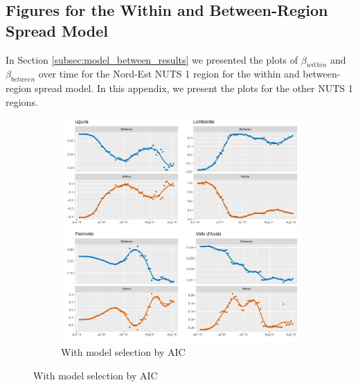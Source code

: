 \documentclass[12pt]{article}
\begin{document}
\begin{appendices}
		\subsection{Figures for the Within and Between-Region Spread Model} \label{sapp:model_between_figures}
		In Section \ref{subsec:model_between_results} we presented the plots of $\beta_{within}$ and $\beta_{between}$ over time for the Nord-Est NUTS 1 region for the within and between-region spread model. In this appendix, we present the plots for the other NUTS 1 regions.
		
        \begin{figure}[H]
    	    \begin{subfigure}{\textwidth}
    	      \centering
    	      \includegraphics[width=\linewidth]{output/model_between_lag14_betas_Nord-Ovest_aic_rolling.pdf}
    	      \caption{With model selection by AIC}
    	      \label{fig:beta_between_over_time_nordovest_aic}
    	    \end{subfigure}
    	\end{figure}
        \begin{figure}[H]\ContinuedFloat
    	    \begin{subfigure}{\textwidth}
    	      \centering

\end{subfigure}
\end{figure}
\end{appendices}
\end{document}
